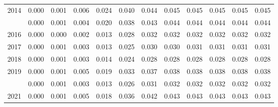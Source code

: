 \documentclass[
]{article}
\begin{document}
\begin{longtable}[t]{lrrrrrrrrrrr}
2014 & 0.000 & 0.001 & 0.006 & 0.024 & 0.040 & 0.044 & 0.045 & 0.045 & 0.045 & 0.045 & 0.045\\
\addlinespace
2015 & 0.000 & 0.001 & 0.004 & 0.020 & 0.038 & 0.043 & 0.044 & 0.044 & 0.044 & 0.044 & 0.044\\
2016 & 0.000 & 0.000 & 0.002 & 0.013 & 0.028 & 0.032 & 0.032 & 0.032 & 0.032 & 0.032 & 0.032\\
2017 & 0.000 & 0.001 & 0.003 & 0.013 & 0.025 & 0.030 & 0.030 & 0.031 & 0.031 & 0.031 & 0.031\\
2018 & 0.000 & 0.001 & 0.003 & 0.014 & 0.024 & 0.028 & 0.028 & 0.028 & 0.028 & 0.028 & 0.028\\
2019 & 0.000 & 0.001 & 0.005 & 0.019 & 0.033 & 0.037 & 0.038 & 0.038 & 0.038 & 0.038 & 0.038\\
\addlinespace
2020 & 0.000 & 0.001 & 0.003 & 0.013 & 0.026 & 0.031 & 0.032 & 0.032 & 0.032 & 0.032 & 0.032\\
2021 & 0.000 & 0.001 & 0.005 & 0.018 & 0.036 & 0.042 & 0.043 & 0.043 & 0.043 & 0.043 & 0.043\\*
\end{longtable}
\end{document}
